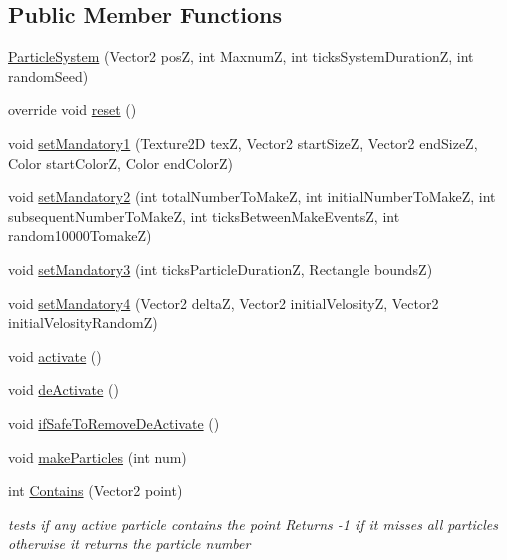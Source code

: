 \subsection*{Public Member Functions}
\begin{DoxyCompactItemize}
\item 
\mbox{\hyperlink{class_r_c___framework_1_1_particle_system_a9baad9b596967f62ce758557a4baecdc}{Particle\+System}} (Vector2 posZ, int MaxnumZ, int ticks\+System\+DurationZ, int random\+Seed)
\item 
override void \mbox{\hyperlink{class_r_c___framework_1_1_particle_system_ac96aa1743b45944d102ddf01d67452c1}{reset}} ()
\item 
void \mbox{\hyperlink{class_r_c___framework_1_1_particle_system_a145da945b2d05fe75735e007796fc158}{set\+Mandatory1}} (Texture2D texZ, Vector2 start\+SizeZ, Vector2 end\+SizeZ, Color start\+ColorZ, Color end\+ColorZ)
\item 
void \mbox{\hyperlink{class_r_c___framework_1_1_particle_system_af7698934f85ed2081ba236db023fa004}{set\+Mandatory2}} (int total\+Number\+To\+MakeZ, int initial\+Number\+To\+MakeZ, int subsequent\+Number\+To\+MakeZ, int ticks\+Between\+Make\+EventsZ, int random10000\+TomakeZ)
\item 
void \mbox{\hyperlink{class_r_c___framework_1_1_particle_system_a4a7d1047a8f891f66c5cc2f290520107}{set\+Mandatory3}} (int ticks\+Particle\+DurationZ, Rectangle boundsZ)
\item 
void \mbox{\hyperlink{class_r_c___framework_1_1_particle_system_a7b3f6b8c93d32699592cb3737f449fa9}{set\+Mandatory4}} (Vector2 deltaZ, Vector2 initial\+VelosityZ, Vector2 initial\+Velosity\+RandomZ)
\item 
void \mbox{\hyperlink{class_r_c___framework_1_1_particle_system_a7757ad5d623f0f275e07dff00d37efd5}{activate}} ()
\item 
void \mbox{\hyperlink{class_r_c___framework_1_1_particle_system_a5203abf6d889ed63facf7c5262a48733}{de\+Activate}} ()
\item 
void \mbox{\hyperlink{class_r_c___framework_1_1_particle_system_a229864cc0b24df0bab9e43b07fdd4b8d}{if\+Safe\+To\+Remove\+De\+Activate}} ()
\item 
void \mbox{\hyperlink{class_r_c___framework_1_1_particle_system_a80b4943e107e2ee29218ebb358e5e0bf}{make\+Particles}} (int num)
\item 
int \mbox{\hyperlink{class_r_c___framework_1_1_particle_system_ad97ae58b6cb5679a4f9ce02cb4d714ea}{Contains}} (Vector2 point)
\begin{DoxyCompactList}\small\item\em tests if any active particle contains the point Returns -\/1 if it misses all particles otherwise it returns the particle number \end{DoxyCompactList}\item 

\end{DoxyCompactItemize}
